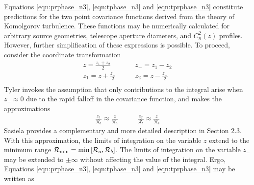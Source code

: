 Equations \ref{eqn:prphase_n3}, \ref{eqn:tphase_n3} and \ref{eqn:tprphase_n3}
constitute predictions for the two point covariance functions derived
from the theory of Komolgorov turbulence.  These functions may be
numerically calculated for arbitrary source geometries, telescope
aperture diameters, and $C_{n}^{2}(z)$ profiles.  However, further
simplification of these expressions is possible.  To proceed, consider
the coordinate transformation
\begin{equation}
\begin{aligned}
z = \frac{z_{1}+z_{2}}{2} \quad & \quad z_{-} = z_{1}-z_{2} \\
z_{1} = z+\frac{z_{-}}{2} \quad & \quad z_{2} = z-\frac{z_{-}}{2} \\
\end{aligned}
\end{equation}
Tyler invokes the assumption that only contributions to the integral
arise when $z_{-} \approx 0$ due to the rapid falloff in the
covariance function, and makes the approximations
\begin{equation}
\begin{aligned}
\frac{z_{1}}{\mathcal{R}_{a}} \approx \frac{z}{\mathcal{R}_{a}} \quad & \quad \frac{z_{2}}{\mathcal{R}_{b}} \approx \frac{z}{\mathcal{R}_{b}} 
\end{aligned}
\end{equation}
Sasiela \cite{Sasiela:2012} provides a complementary and
more detailed description in Section 2.3.  With this approximation,
the limits of integration on the variable $z$ extend to the minimum
range $\mathcal{R}_{\rm min} = {\rm min}\left[\mathcal{R}_{a},
  \mathcal{R}_{b}\right]$.  The limits of integration on the variable
$z_{-}$ may be extended to $\pm\infty$ without affecting the value of
the integral.  Ergo, Equations \ref{eqn:prphase_n3},
\ref{eqn:tphase_n3} and \ref{eqn:tprphase_n3} may be written as
